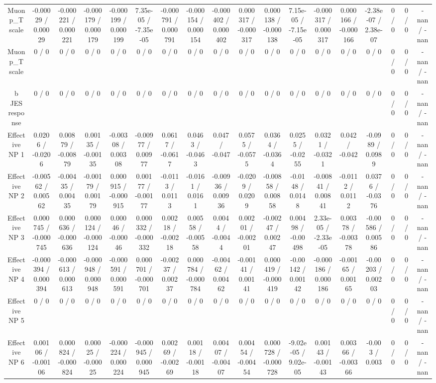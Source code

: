 \documentclass[10pt]{article}
\begin{document}
\begin{table}[htbp]
\begin{center}
\begin{tabular}{|c|c|c|c|c|c|c|c|c|c|c|c|c|c|c|c|c|c|}
  Muon p_{T} scale & -0.00029 / 0.00029 & -0.000221 / 0.000221 & -0.000179 / 0.000179 & -0.000199 / 0.000199 & 7.35e-05 / -7.35e-05 & -0.000791 / 0.000791 & -0.000154 / 0.000154 & -0.000402 / 0.000402 & 0.000317 / -0.000317 & 0.000138 / -0.000138 & 7.15e-05 / -7.15e-05 & -0.000317 / 0.000317 & 0.000166 / -0.000166 & -2.38e-07 / 2.38e-07 & 0 / 0 & 0 / 0 & -nan / -nan \\ 
  Muon p_{T} scale & 0 / 0 & 0 / 0 & 0 / 0 & 0 / 0 & 0 / 0 & 0 / 0 & 0 / 0 & 0 / 0 & 0 / 0 & 0 / 0 & 0 / 0 & 0 / 0 & 0 / 0 & 0 / 0 & 0 / 0 & 0 / 0 & -nan / -nan \\ 
  b JES response & 0 / 0 & 0 / 0 & 0 / 0 & 0 / 0 & 0 / 0 & 0 / 0 & 0 / 0 & 0 / 0 & 0 / 0 & 0 / 0 & 0 / 0 & 0 / 0 & 0 / 0 & 0 / 0 & 0 / 0 & 0 / 0 & -nan / -nan \\ 
  Effective NP 1 & 0.0206 / -0.0206 & 0.00879 / -0.00879 & 0.00135 / -0.00135 & -0.00308 / 0.00308 & -0.00977 / 0.00977 & 0.0617 / -0.0617 & 0.0463 / -0.0463 & 0.047 / -0.047 & 0.0575 / -0.0575 & 0.0364 / -0.0364 & 0.0255 / -0.0255 & 0.0321 / -0.0321 & 0.042 / -0.042 & -0.0989 / 0.0989 & 0 / 0 & 0 / 0 & -nan / -nan \\ 
  Effective NP 2 & -0.00562 / 0.00562 & -0.00435 / 0.00435 & -0.00179 / 0.00179 & 0.000915 / -0.000915 & 0.00177 / -0.00177 & -0.0113 / 0.0113 & -0.0161 / 0.0161 & -0.00936 / 0.00936 & -0.0209 / 0.0209 & -0.00858 / 0.00858 & -0.0148 / 0.0148 & -0.00841 / 0.00841 & -0.0112 / 0.0112 & 0.0376 / -0.0376 & 0 / 0 & 0 / 0 & -nan / -nan \\ 
  Effective NP 3 & 0.000745 / -0.000745 & 0.000636 / -0.000636 & 0.000124 / -0.000124 & 0.00046 / -0.00046 & 0.000332 / -0.000332 & 0.00218 / -0.00218 & 0.00558 / -0.00558 & 0.0044 / -0.0044 & 0.00201 / -0.00201 & -0.00247 / 0.00247 & 0.00498 / -0.00498 & 2.33e-05 / -2.33e-05 & 0.00378 / -0.00378 & -0.00586 / 0.00586 & 0 / 0 & 0 / 0 & -nan / -nan \\ 
  Effective NP 4 & -0.000394 / 0.000394 & -0.000613 / 0.000613 & -0.000948 / 0.000948 & -0.000591 / 0.000591 & 0.000701 / -0.000701 & -0.00237 / 0.00237 & 0.000784 / -0.000784 & -0.00462 / 0.00462 & -0.00141 / 0.00141 & 0.000419 / -0.000419 & -0.00142 / 0.00142 & -0.000186 / 0.000186 & -0.00165 / 0.00165 & -0.00203 / 0.00203 & 0 / 0 & 0 / 0 & -nan / -nan \\ 
  Effective NP 5 & 0 / 0 & 0 / 0 & 0 / 0 & 0 / 0 & 0 / 0 & 0 / 0 & 0 / 0 & 0 / 0 & 0 / 0 & 0 / 0 & 0 / 0 & 0 / 0 & 0 / 0 & 0 / 0 & 0 / 0 & 0 / 0 & -nan / -nan \\ 
  Effective NP 6 & 0.00106 / -0.00106 & 0.000824 / -0.000824 & 0.00025 / -0.00025 & -0.000224 / 0.000224 & -0.000945 / 0.000945 & 0.00269 / -0.00269 & 0.00118 / -0.00118 & 0.00407 / -0.00407 & 0.00454 / -0.00454 & 0.000728 / -0.000728 & -9.02e-05 / 9.02e-05 & 0.00143 / -0.00143 & 0.00366 / -0.00366 & -0.003 / 0.003 & 0 / 0 & 0 / 0 & -nan / -nan \\ 

\end{tabular}
\end{center}
\end{table}
\end{document}
